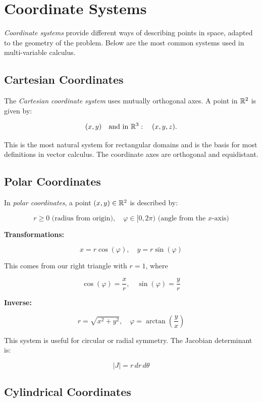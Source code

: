 \chapter{Coordinate Systems}

\emph{Coordinate systems} provide different ways of describing points in space, adapted to the geometry of the 
problem. Below are the most common systems used in multi-variable calculus.

\section{Cartesian Coordinates}

The \emph{Cartesian coordinate system} uses mutually orthogonal axes. A point in \( \mathbb{R}^2 \) 
is given by:

\[
    (x, y) \quad \text{and in } \mathbb{R}^3: \quad (x, y, z).
\]


This is the most natural system for rectangular domains and is the basis for most definitions in vector 
calculus. The coordinate axes are orthogonal and equidistant.

\section{Polar Coordinates}

In \emph{polar coordinates}, a point \( (x, y) \in \mathbb{R}^2 \) is described by:

\[
    r \ge 0 \text{ (radius from origin)}, \quad \varphi \in [0, 2\pi) \text{ (angle from the \(x\)-axis)}
\]

\textbf{Transformations:}

\[
    x = r \cos(\varphi), \quad y = r \sin(\varphi)
\]

This comes from our right triangle with \(r = 1\), where

\[
    \cos(\varphi) = \frac{x}{r}, \quad \sin(\varphi) = \frac{y}{r}
\]

\textbf{Inverse:}

\[
    r = \sqrt{x^2 + y^2}, \quad \varphi = \arctan\left(\frac{y}{x}\right)
\]

This system is useful for circular or radial symmetry. The Jacobian determinant is:

\[
    |J| = r \, dr \, d\theta
\]

\section{Cylindrical Coordinates}

